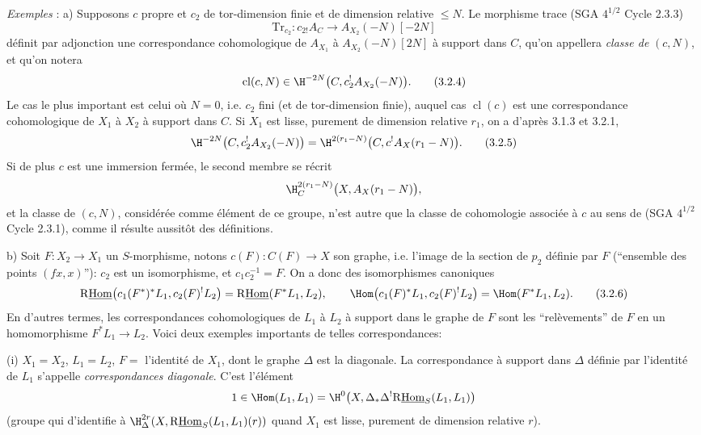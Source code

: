 \emph{Exemples} : a) Supposons $c$ propre et $c_2$ de tor-dimension finie et de dimension relative $\leq N$. Le morphisme trace (SGA $4^{1/2}$ Cycle 2.3.3)
\[
\mathrm{Tr}_{c_2}:c_{2!}A_C\longrightarrow A_{X_2}(-N)[-2N]
\]
définit par adjonction une correspondance cohomologique de $A_{X_1}$ à $A_{X_2}(-N)[2N]$ 
à
support dans $C$, qu'on appellera \emph{classe de} $(c,N)$, et qu'on notera
\begin{equation}
\operatorname{cl}(c,N)\in \H^{-2N}\bigl(C,c_2^!A_{X_2}(-N)\bigr).
\tag{3.2.4}
\end{equation}
Le cas le plus important est celui où $N=0$, i.e. $c_2$ fini (et de tor-dimension finie), auquel cas $\operatorname{cl}(c)$ est une correspondance cohomologique de $X_1$ à $X_2$ à support dans $C$. Si $X_1$ est lisse, purement de dimension relative $r_1$, on a d'après 3.1.3 et 3.2.1,
\begin{equation}
\H^{-2N}\bigl(C,c_2^!A_{X_2}(-N)\bigr)
=
\H^{2(r_1-N)}\bigl(C,c^!A_X(r_1-N)\bigr).
\tag{3.2.5}
\end{equation}
Si de plus $c$ est une immersion fermée, le second membre se récrit
\[
\H^{2(r_1-N)}_C\bigl(X,A_X(r_1-N)\bigr),
\]
et la classe de $(c,N)$, considérée comme élément de ce groupe, n'est autre que la classe de cohomologie associée à $c$ au sens de (SGA $4^{1/2}$ Cycle 2.3.1), comme il résulte aussitôt des définitions.

b) Soit $F:X_2\to X_1$ un $S$-morphisme, notons $c(F):C(F)\to X$ son graphe, i.e. l'image de la section de $p_2$ définie par $F$ (``ensemble des points $(fx,x)$''): $c_2$ est un isomorphisme, et $c_1c_2^{-1}=F$. On a donc des isomorphismes canoniques
\begin{equation}
\mathrm{R}\underline{\mathrm{Hom}}\bigl(c_1(F^*)^*L_1,c_2(F)^!L_2\bigr)=\mathrm{R}\underline{\mathrm{Hom}}(F^*L_1,L_2),
\qquad
\Hom\bigl(c_1(F)^*L_1,c_2(F)^!L_2\bigr)=\Hom(F^*L_1,L_2).
\tag{3.2.6}
\end{equation}
En d'autres termes, les correspondances cohomologiques de $L_1$ à $L_2$ à support dans le graphe de $F$ sont les ``relèvements'' de $F$ en un homomorphisme $F^*L_1\to L_2$. Voici deux exemples importants de telles correspondances:

(i) $X_1=X_2$, $L_1=L_2$, $F=$ l'identité de $X_1$, dont le graphe $\Delta$ est la diagonale. La correspondance à support dans $\Delta$ définie par l'identité de $L_1$ s'appelle \emph{correspondances diagonale}. C'est l'élément
\[
1\in \Hom(L_1,L_1)=\H^0\bigl(X,\Delta_*\Delta^!\mathrm{R}\underline{\mathrm{Hom}}_S(L_1,L_1)\bigr)
\]
(groupe qui d'identifie à 
$\H^{2r}_\Delta(X,\mathrm{R}\underline{\mathrm{Hom}}_S(L_1,L_1)(r))$ quand $X_1$ est lisse, purement de dimension relative $r$).

